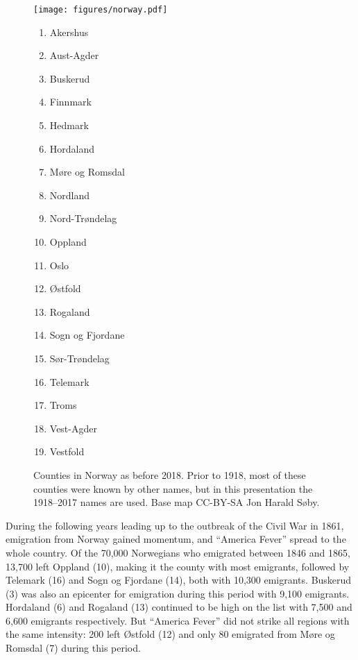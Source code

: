 \documentclass[output=paper]{langscibook}
\begin{document}
\begin{figure}
\begin{minipage}{.7\textwidth}
\texttt{[image: figures/norway.pdf]}
\end{minipage}%
\begin{minipage}{.3\textwidth}
\begin{enumerate}[nosep]
\small
\item Akershus
\item Aust-Agder
\item Buskerud
\item Finnmark
\item Hedmark
\item Hordaland
\item Møre og Romsdal
\item Nordland
\item Nord-Trøndelag
\item Oppland
\item Oslo
\item Østfold
\item Rogaland
\item Sogn og Fjordane
\item Sør-Trøndelag
\item Telemark
\item Troms
\item Vest-Agder
\item Vestfold
\end{enumerate}
\end{minipage}
\caption{Counties in Norway as before 2018. Prior to 1918, most of these counties were known by other names, but in this presentation the 1918--2017 names are used. Base map CC-BY-SA Jon Harald Søby.}
\label{fig:hjelde:2}
\end{figure}

During the following years leading up to the outbreak of the Civil War in 1861, emigration from Norway gained momentum, and “America Fever” spread to the whole country. Of the 70,000 Norwegians who emigrated between 1846 and 1865, 13,700 left Oppland (10), making it the county with most emigrants, followed by Telemark (16) and Sogn og Fjordane (14), both with 10,300 emigrants. Buskerud (3) was also an epicenter for emigration during this period with 9,100 emigrants. Hordaland (6) and Rogaland (13) continued to be high on the list with 7,500 and 6,600 emigrants respectively. But “America Fever” did not strike all regions with the same intensity: 200 left Østfold (12) and only 80 emigrated from Møre og Romsdal (7) during this period. 
\end{document}
